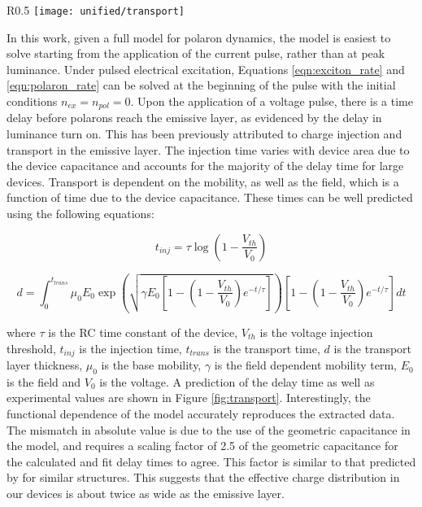 \documentclass[../thesis.tex]{subfiles}
\begin{document}
\begin{wrapfigure}{R}{0.5\textwidth}
\centering
\texttt{[image: unified/transport]}
\caption{Extracted polaron injection time is shown as a function of voltage along with a fit from the model.}
\label{fig:transport}
\end{wrapfigure}

In this work, given a full model for polaron dynamics, the model is easiest to solve starting from the application of the current pulse, rather than at peak luminance.
Under pulsed electrical excitation, Equations \ref{eqn:exciton_rate} and \ref{eqn:polaron_rate} can be solved at the beginning of the pulse with the initial conditions $n_{ex}=n_{pol}=0$.  
Upon the application of a voltage pulse, there is a time delay before polarons reach the emissive layer, as evidenced by the delay in luminance turn on.  
This has been previously attributed to charge injection and transport in the emissive layer.\supercite{Wei2004}
The injection time varies with device area due to the device capacitance and accounts for the majority of the delay time for large devices.
Transport is dependent on the mobility, as well as the field, which is a function of time due to the device capacitance.  
These times can be well predicted using the following equations:

\begin{equation}
t_{inj}=\tau\log\left(1-\frac{V_{th}}{V_0}\right)
\end{equation}

\begin{equation}
d=\int_0^{t_{trans}}\mu_0 E_0 \exp \left( \sqrt{\gamma E_0\left[1-\left(1-\frac{V_{th}}{V_0}\right)e^{-t/\tau}\right]}\right)\left[1-\left(1-\frac{V_{th}}{V_0}\right)e^{-t/\tau}\right] dt
\end{equation}


where $\tau$ is the RC time constant of the device, $V_{th}$ is the voltage injection threshold, $t_{inj}$ is the injection time, $t_{trans}$ is the transport time, $d$ is the transport layer thickness, $\mu_0$ is the base mobility, $\gamma$ is the field dependent mobility term, $E_0$ is the field and $V_0$ is the voltage.
A prediction of the delay time as well as experimental values are shown in Figure \ref{fig:transport}.
Interestingly, the functional dependence of the model accurately reproduces the extracted data.
The mismatch in absolute value is due to the use of the geometric capacitance in the model, and requires a scaling factor of 2.5 of the geometric capacitance for the calculated and fit delay times to agree.  This factor is similar to that predicted by \textcite{Liu2012d} for similar structures.
This suggests that the effective charge distribution in our devices is about twice as wide as the emissive layer.
\end{document}
